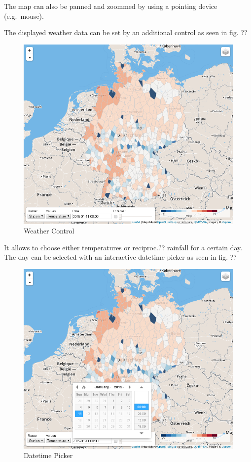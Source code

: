 The map can also be panned and zoommed by using a pointing device
(e.g.~mouse).

The displayed weather data can be set by an additional control as seen
in fig. ??

\begin{figure}[htbp]
\centering
\includegraphics{pictures/screenshot-control.png}
\caption{Weather Control}
\end{figure}

It allows to choose either temperatures or reciproc.?? rainfall for a
certain day. The day can be selected with an interactive datetime picker
as seen in fig. ??

\begin{figure}[htbp]
\centering
\includegraphics{pictures/screenshot-control-datetime.png}
\caption{Datetime Picker}
\end{figure}

